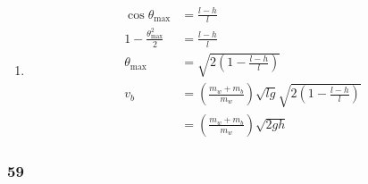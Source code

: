 \documentclass{article}
\begin{document}
\begin{enumerate}
  \item

        \begin{align*}
          \cos \theta_\text{max}            & = \frac{l - h}{l}                                                                             \\
          1 - \frac{\theta_\text{max}^2}{2} & = \frac{l - h}{l}                                                                             \\
          \theta_\text{max}                 & = \sqrt{2 \left( 1 - \frac{l - h}{l} \right)}                                                 \\
          v_b                               & = \left( \frac{m_w + m_b}{m_w} \right) \sqrt{l g} \sqrt{2 \left( 1 - \frac{l - h}{l} \right)} \\
                                            & = \left( \frac{m_w + m_b}{m_w} \right) \sqrt{2 g h}
        \end{align*}
\end{enumerate}

\subsubsection{59}
\end{document}
